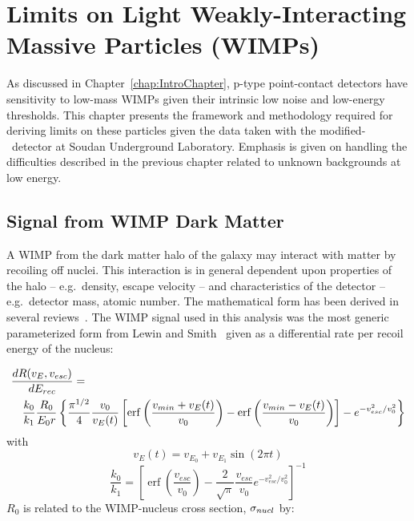 

\chapter{Limits on Light Weakly-Interacting Massive Particles (WIMPs)}
\label{chap:DMWIMPLimits}

	As discussed in Chapter~\ref{chap:IntroChapter}, p-type point-contact detectors have sensitivity to low-mass WIMPs given their intrinsic low noise and low-energy thresholds.  This chapter presents the framework and methodology required for deriving limits on these particles given the data taken with the modified-\bege~detector at Soudan Underground Laboratory.  Emphasis is given on handling the difficulties described in the previous chapter related to unknown backgrounds at low energy.  

	\section{Signal from WIMP Dark Matter}
	\label{sec:CalcLimitsOnWIMPSignal}	

	A WIMP from the dark matter halo of the galaxy may interact with matter by recoiling off nuclei.  This interaction is in general dependent upon properties of the halo -- e.g.~density, escape velocity -- and characteristics of the detector -- e.g.~detector mass, atomic number.  The mathematical form has been derived in several reviews~\cite{Lew96,Jun96}.  The WIMP signal used in this analysis was the most generic parameterized form from Lewin and Smith~\cite{Lew96} given as a differential rate per recoil energy of the nucleus:

		\begin{eqnarray}
			\begin{aligned}
			\lefteqn{\frac{dR (v_{E}, v_{esc})}{dE_{rec}} = } \\ 
				& & \frac{k_{0}}{k_{1}} \frac{R_{0}}{E_{0} r} 
				\left\{ 
			 		\frac{\pi^{1/2}}{4} \frac{v_{0}}{v_{E}(t)} 
					\left[ 
						\operatorname{erf} \left( \frac{v_{min} + v_{E}(t)}{v_{0}} \right) - 
							   \operatorname{erf} \left( \frac{v_{min} - v_{E}(t)}{v_{0}} \right) 
					\right] 
					- e^{-v_{esc}^{2}/v_{0}^{2}} 
				\right\}
			\label{eqn:WIMPMasterEqn}
			\end{aligned}
		\end{eqnarray}
with 
		\[
		v_{E}(t) = v_{E_{0}} + v_{E_{1}}\sin (2 \pi t)
		\]
		\[
		\frac{k_{0}}{k_{1}} = \left[
			\operatorname{erf} \left( \frac{v_{esc}}{v_{0}} \right ) - 
			\frac{2}{\sqrt{\pi}} \frac{v_{esc}}{v_{0}} e^{-v_{esc}^{2}/v_{0}^{2}}
		\right]^{-1}
		\]
$R_{0}$ is related to the WIMP-nucleus cross section, $\sigma_{nucl}$ by:

